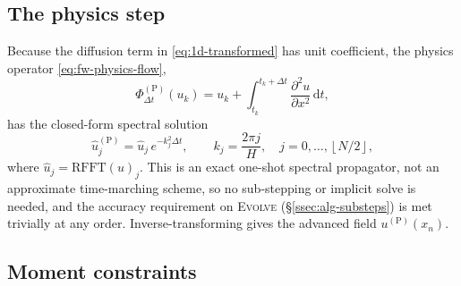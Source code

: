 \subsection{The physics step}\label{ssec:1d-physics-step}

Because the diffusion term in \eqref{eq:1d-transformed} has unit coefficient,
the physics operator \eqref{eq:fw-physics-flow},
\begin{equation}\label{eq:1d-physics-flow}
  \Phi_{\Delta t}^{(\mathrm{P})}(u_k)
  = u_k + \int_{t_k}^{t_k + \Delta t} \frac{\partial^2 u}{\partial x^2}\, \mathrm{d}t,
\end{equation}
has the closed-form spectral solution
\begin{equation}\label{eq:1d-propagator}
  \hat u_j^{(\mathrm{P})} = \hat u_j\, e^{-k_j^2 \Delta t},
  \qquad k_j = \frac{2\pi j}{H}, \quad j = 0, \dots, \left\lfloor N/2 \right\rfloor,
\end{equation}
where $\hat u_j = \mathrm{RFFT}(u)_j$. This is an exact one-shot spectral
propagator, not an approximate time-marching scheme, so no sub-stepping or
implicit solve is needed, and the accuracy requirement on \textsc{Evolve}
(\S\ref{ssec:alg-substeps}) is met trivially at any order. Inverse-transforming
gives the advanced field $u^{(\mathrm{P})}(x_n)$.

\subsection{Moment constraints}\label{ssec:1d-moments}


